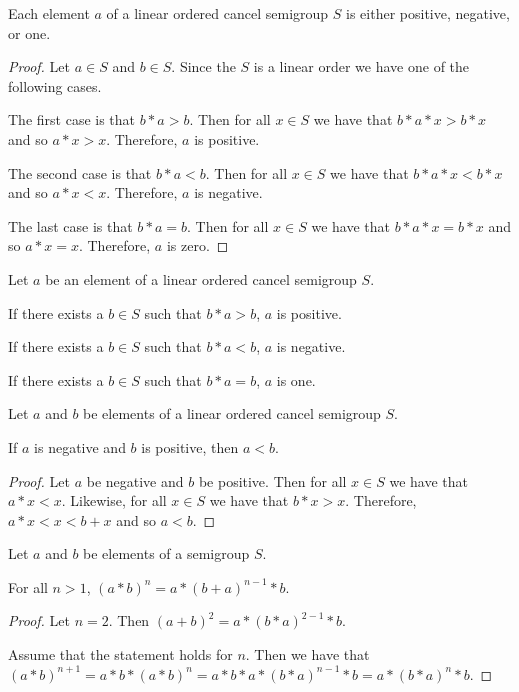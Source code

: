\begin{theorem}\label{thm:pos_neg_or_one}\leanok
{}
Each element $a$ of a linear ordered cancel semigroup $S$ is either positive, negative, or one.
\end{theorem}
\begin{proof}
Let $a\in S$ and $b\in S$. Since the $S$ is a linear order we have one of the following cases.

The first case is that $b * a > b$. Then for all $x\in S$ we have that $b * a * x > b * x$
and so $a * x > x$. Therefore, $a$ is positive.

The second case is that $b * a < b$. Then for all $x\in S$ we have that $b * a * x < b * x$
and so $a * x < x$. Therefore, $a$ is negative.

The last case is that $b * a = b$. Then for all $x\in S$ we have that $b * a * x = b * x$
and so $a * x = x$. Therefore, $a$ is zero.
\end{proof}

\begin{corollary}\label{lem:right_forall}\leanok
{}
Let $a$ be an element of a linear ordered cancel semigroup $S$. 

If there exists a $b\in S$ such that $b * a > b$, $a$ is positive.

If there exists a $b\in S$ such that $b * a < b$, $a$ is negative.

If there exists a $b\in S$ such that $b * a = b$, $a$ is one.
\end{corollary}

\begin{theorem}\label{thm:neg_lt_pos}\leanok
{}
Let $a$ and $b$ be elements of a linear ordered cancel semigroup $S$.

If $a$ is negative and $b$ is positive, then $a < b$.
\end{theorem}
\begin{proof}
Let $a$ be negative and $b$ be positive. Then for all $x\in S$ we have that $a * x < x$.
Likewise, for all $x\in S$ we have that $b * x > x$.
Therefore, $a * x < x < b + x$ and so $a < b$.
\end{proof}

\begin{lemma}\label{split_first_and_last}\leanok
Let $a$ and $b$ be elements of a semigroup $S$.

For all $n > 1$, $(a*b)^n = a * (b+a)^{n-1} * b$.
\end{lemma}
\begin{proof}
Let $n=2$. Then $(a+b)^2 = a * (b*a)^{2-1} * b$.

Assume that the statement holds for $n$.
Then we have that $(a*b)^{n+1} = a * b * (a*b)^n = a * b * a * (b*a)^{n-1} * b = a * (b*a)^n * b$.
\end{proof}

